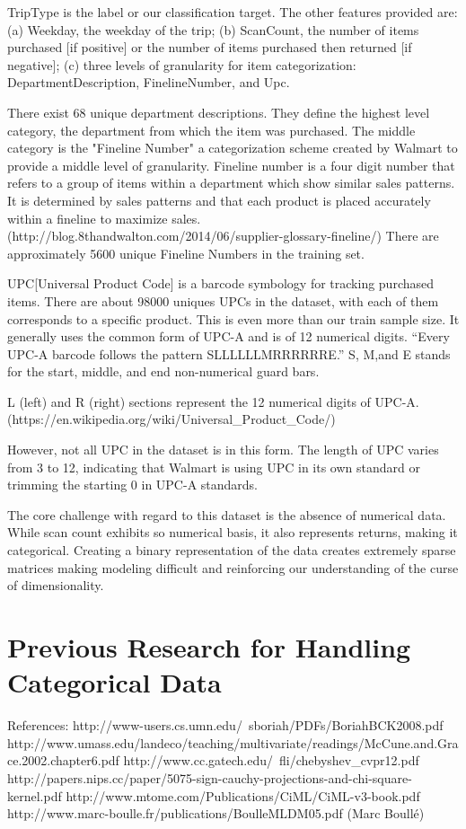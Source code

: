 \documentclass{article} %
\begin{document}
TripType is the label or our classification target. The other features provided are: (a) Weekday, the weekday of the trip; (b) ScanCount, the number of items purchased [if positive] or the number of items purchased then returned [if negative]; (c) three levels of granularity for item categorization: DepartmentDescription, FinelineNumber, and Upc. 

There exist 68 unique department descriptions. They define the highest level category, the department from which the item was purchased. The middle category is the "Fineline Number" a categorization scheme created by Walmart to provide a middle level of granularity. Fineline number is a four digit number that refers to a group of items within a department which show similar sales patterns. It is determined by sales patterns and that each product is placed accurately within a fineline to maximize sales. (http://blog.8thandwalton.com/2014/06/supplier-glossary-fineline/) There are approximately 5600 unique Fineline Numbers in the training set. 

UPC[Universal Product Code] is a barcode symbology for tracking purchased items. There are about 98000 uniques UPCs in the dataset, with each of them corresponds to a specific product. This is even more than our train sample size. It generally uses the common form of UPC-A and is of 12 numerical digits. “Every UPC-A barcode follows the pattern SLLLLLLMRRRRRRE.” S, M,and E stands for the start, middle, and end non-numerical guard bars. 

L (left) and R (right) sections represent the 12 numerical digits of UPC-A.(https://en.wikipedia.org/wiki/Universal\_Product\_Code/)

However, not all UPC in the dataset is in this form. The length of UPC varies from 3 to 12, indicating that Walmart is using UPC in its own standard or trimming the starting 0 in UPC-A standards.

The core challenge with regard to this dataset is the absence of numerical data. While scan count exhibits so numerical basis, it also represents returns, making it categorical. Creating a binary representation of the data creates extremely sparse matrices making modeling difficult and reinforcing our understanding of the curse of dimensionality.

\section{Previous Research for Handling Categorical Data}
\label{gen_inst}
References:
http://www-users.cs.umn.edu/~sboriah/PDFs/BoriahBCK2008.pdf
http://www.umass.edu/landeco/teaching/multivariate/readings/McCune.and.Grace.2002.chapter6.pdf
http://www.cc.gatech.edu/~fli/chebyshev\_cvpr12.pdf
http://papers.nips.cc/paper/5075-sign-cauchy-projections-and-chi-square-kernel.pdf
http://www.mtome.com/Publications/CiML/CiML-v3-book.pdf
http://www.marc-boulle.fr/publications/BoulleMLDM05.pdf (Marc Boullé)
\end{document}
